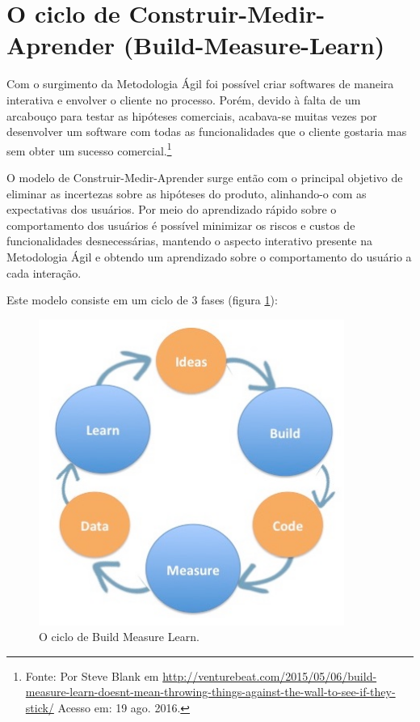 \section{O ciclo de Construir-Medir-Aprender (Build-Measure-Learn)}
\par Com o surgimento da Metodologia Ágil foi possível criar softwares de maneira interativa e envolver o cliente no processo. Porém, devido à falta de um arcabouço para testar as hipóteses comerciais, acabava-se muitas vezes por desenvolver um software com todas as funcionalidades que o cliente gostaria mas sem obter um sucesso comercial.\footnote{Fonte: Por Steve Blank em \url{http://venturebeat.com/2015/05/06/build-measure-learn-doesnt-mean-throwing-things-against-the-wall-to-see-if-they-stick/} Acesso em: 19 ago. 2016.}
\par O modelo de Construir-Medir-Aprender surge então com o principal objetivo de eliminar as incertezas sobre as hipóteses do produto, alinhando-o com as expectativas dos usuários. Por meio do aprendizado rápido sobre o comportamento dos usuários é possível minimizar os riscos e custos de funcionalidades desnecessárias, mantendo o aspecto interativo presente na Metodologia Ágil e obtendo um aprendizado sobre o comportamento do usuário a cada interação.
\par Este modelo consiste em um ciclo de 3 fases (figura \ref{fig:buildmeasurelearn}):
\begin{figure}[htb]
\centering
\includegraphics[width=10cm]{figuras/buildmeasurelearn}
\caption{\label{fig:buildmeasurelearn}O ciclo de Build Measure Learn.}
\end{figure}
